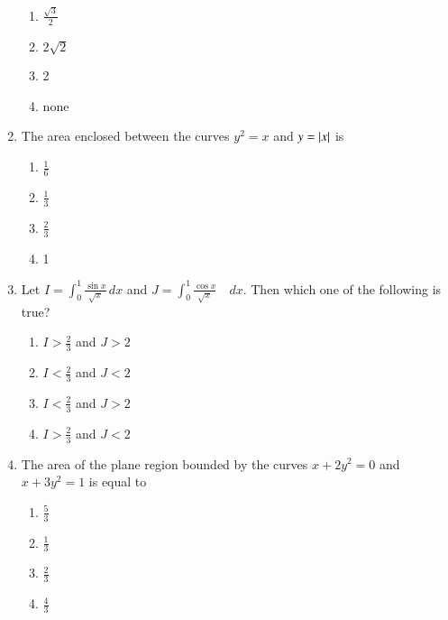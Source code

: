 \documentclass[journal]{IEEEtran}
\begin{document}
\begin{enumerate}
    		   \hfill {}
		   \begin{enumerate}
		      \item $\frac{\sqrt{3}}{2}$
		      \item $2\sqrt{2}$
		      \item 2
		      \item none
		   \end{enumerate} 
	   \item 
		  The area enclosed between the curves $y^{2}=x$ and $y=\left\vert x\right\vert$ is
		 \hfill {}
		 \begin{enumerate}
		     \item $\frac{1}{6}$
		     \item $\frac{1}{3}$
		     \item $\frac{2}{3}$
		     \item 1
		 \end{enumerate}
	   \item 
		 Let $I=\int_{0}^{1} \frac{\sin x}{\sqrt{x}} \,dx$ and $J=\int_{0}^{1} \frac{\cos x}{\sqrt{x}} \quad dx$. Then which one of the following is true?
		\hfill {} 
		\begin{enumerate}
		    \item $I>\frac{2}{3}$ and $J>2$
		    \item $I<\frac{2}{3}$ and $J<2$
		    \item $I<\frac{2}{3}$ and $J>2$
		    \item $I>\frac{2}{3}$ and $J<2$
		\end{enumerate}
	   \item 
		 The area of the plane region bounded by the curves $x+2y^{2}=0$ and $x+3y^{2}=1$ is equal to  
		\hfill {}
		\begin{enumerate}
		   \item $\frac{5}{3}$
		   \item $\frac{1}{3}$
		   \item $\frac{2}{3}$
		   \item $\frac{4}{3}$
		\end{enumerate}
	\end{enumerate}
	
\end{document}
